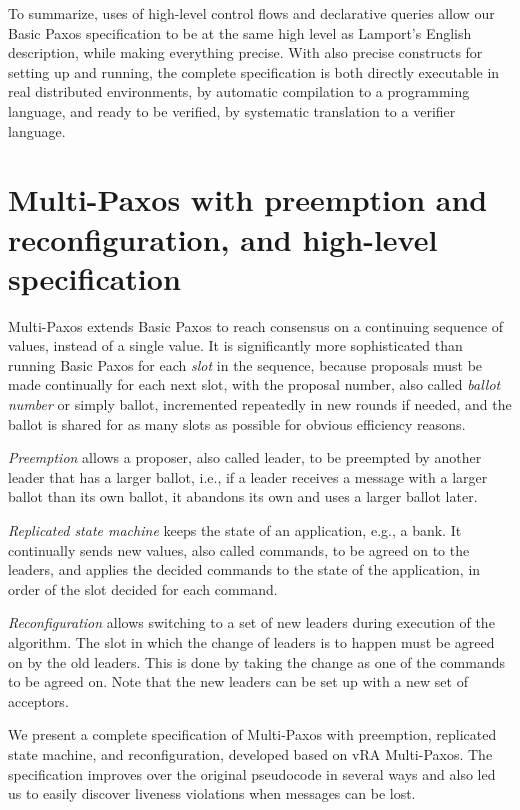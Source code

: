 \documentclass[11pt]{article}
\newcommand{\defn}[1]{\textit{#1}} %
\newcommand{\mysec}[1]{\section{#1}}
\begin{document}
To summarize, uses of high-level control flows and declarative queries
allow our Basic Paxos specification to be at the same high level as
Lamport's English description, while making everything %
precise.
With also precise constructs for setting up and running, the complete
specification is both directly executable in real distributed environments,
by automatic compilation to a programming language,
and ready to be verified, by systematic translation to a verifier language.


\mysec{Multi-Paxos with preemption and reconfiguration, and high-level specification}
\label{sec-multi}

Multi-Paxos extends Basic Paxos to reach consensus on a continuing sequence
of values, instead of a single value.
It is significantly more sophisticated than running Basic Paxos for
each \defn{slot} in the sequence, %
because proposals must be made continually for each next slot, with
the proposal number, also called \defn{ballot number} or simply
ballot, incremented repeatedly in new rounds if needed, and the ballot
is shared for as many slots as possible for obvious efficiency reasons.


\defn{Preemption} allows a proposer, also called leader, to be preempted by
another leader that has a larger ballot, i.e., if a leader receives a
message with a larger ballot than its own ballot, it abandons its own
and uses a larger ballot later.

\defn{Replicated state machine} keeps the state of an application, e.g., a
bank.  It continually sends new values, also called commands, to be agreed
on to the leaders, and applies the decided commands to the state of the
application, in order of the slot decided for each command.

\defn{Reconfiguration} allows switching to a set of new leaders during
execution of the algorithm.  The slot in which the change of leaders is to
happen must be agreed on by the old leaders.  This is done by taking the
change as one of the commands to be agreed on.
Note that the new leaders can be set up with a new set of acceptors.

We present a complete specification of Multi-Paxos with preemption,
replicated state machine, and reconfiguration, developed based on vRA
Multi-Paxos.  The specification improves over the original pseudocode in
several ways and also led us to easily discover liveness violations when
messages can be lost.


\end{document}
